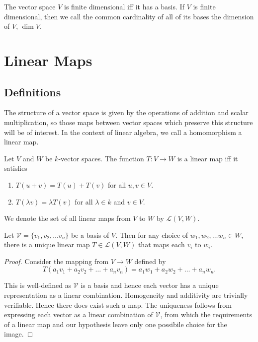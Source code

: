\documentclass[]{article}
\begin{document}
\begin{defi} 
		The vector space $V$ is finite dimensional iff it has a basis.
		If $V$ is finite dimensional, then we call the common cardinality of all of its bases the dimension of $V$, $\dim V$.
\end{defi}

\section{Linear Maps}

\subsection{Definitions}

The structure of a vector space is given by the operations of addition and scalar multiplication, so those maps between vector spaces which preserve this structure will be of interest. In the context of linear algebra, we call a homomorphism a linear map.

\begin{defi} 
		Let $V$ and $W$ be $k$-vector spaces. The function $T: V \to W$ is a linear map iff it satisfies
		\begin{enumerate}
				\item $T(u + v) = T(u) + T(v)$ for all $u, v \in V$.
				\item $T(\lambda v) = \lambda T(v)$ for all $\lambda \in k$ and $v \in V$.
		\end{enumerate}

		We denote the set of all linear maps from $V$ to $W$ by $\mathcal{L}(V,W)$.
\end{defi}

\begin{thm}
		Let $\mathcal{V} = \{v_1, v_2, \ldots v_n\}$ be a basis of $V$. Then for any choice of $w_1, w_2, \ldots w_n \in W$, there is a unique linear map $T \in \mathcal{L}(V,W)$ that maps each $v_i$ to $w_i$.
\end{thm}

\begin{proof}
		Consider the mapping from $V \to W$ defined by
		\[
		T(a_1 v_1 + a_2 v_2 + \ldots + a_n v_n) = a_1 w_1 + a_2 w_2 + \ldots + a_n w_n
		.\] 

		This is well-defined as $\mathcal{V}$ is a basis and hence each vector has a unique representation as a linear combination. Homogeneity and additivity are trivially verifiable. Hence there does exist such a map. The uniqueness follows from expressing each vector as a linear combination of $\mathcal{V}$, from which the requirements of a linear map and our hypothesis leave only one possibile choice for the image.
\end{proof}
\end{document}
